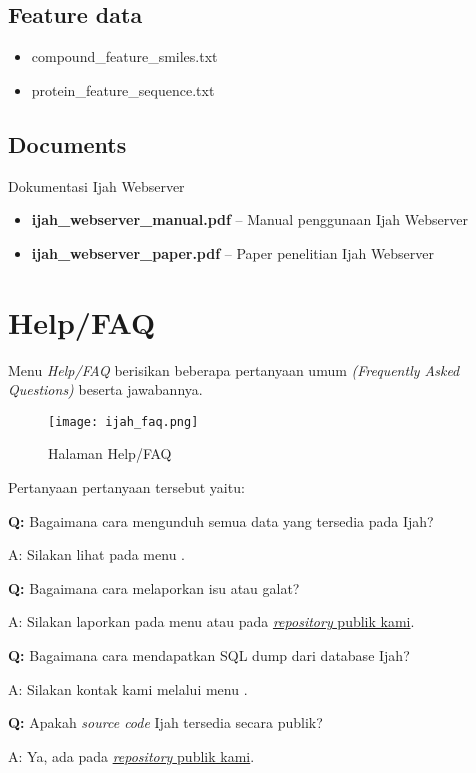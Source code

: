 \subsection{Feature data}
\begin{itemize}
\item compound\_feature\_smiles.txt  
\item protein\_feature\_sequence.txt  
\end{itemize}

\subsection{Documents}
Dokumentasi Ijah Webserver
\begin{itemize}
\item \textbf{ijah\_webserver\_manual.pdf} -- Manual penggunaan Ijah Webserver
\item \textbf{ijah\_webserver\_paper.pdf} -- Paper penelitian Ijah Webserver
\end{itemize}

\section{Help/FAQ}
Menu \emph{Help/FAQ} berisikan beberapa pertanyaan umum \emph{(Frequently Asked Questions)} beserta jawabannya. 

\begin{figure}[H]
	\centering
	\texttt{[image: ijah\_faq.png]}
	\caption{Halaman Help/FAQ}
	\label{fig:ijah_faq}
\end{figure}

Pertanyaan pertanyaan tersebut yaitu:

\textbf{Q:} Bagaimana cara mengunduh semua data yang tersedia pada Ijah?

A: Silakan lihat pada menu .

\textbf{Q:} Bagaimana cara melaporkan isu atau galat?

A: Silakan laporkan pada menu  atau pada \href{https://github.com/tttor/csipb-jamu-prj}{\emph{repository} publik kami}.

\textbf{Q:} Bagaimana cara mendapatkan SQL dump dari database Ijah?

A: Silakan kontak kami melalui menu .

\textbf{Q:} Apakah \emph{source code} Ijah tersedia secara publik?

A: Ya, ada pada \href{https://github.com/tttor/csipb-jamu-prj}{\emph{repository} publik kami}.

